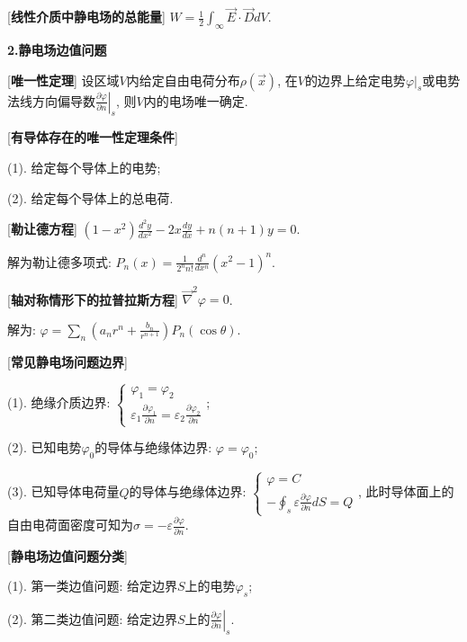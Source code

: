 [\textbf{线性介质中静电场的总能量}] $W=\frac{1}{2}\int_\infty \vec E\cdot\vec D dV$.\par

\begin{center}
 \textbf{2.静电场边值问题}
\end{center}

[\textbf{唯一性定理}] 设区域$V$内给定自由电荷分布$\rho(\vec x)$, 在$V$的边界上给定电势$\varphi|_s$或电势法线方向偏导数$\left.\frac{\partial \varphi}{\partial n}\right|_s$, 则$V$内的电场唯一确定.\par

[\textbf{有导体存在的唯一性定理条件}] \par
\qquad (1). 给定每个导体上的电势;\par
\qquad (2). 给定每个导体上的总电荷.\par

[\textbf{勒让德方程}] $(1-x^2)\frac{d^2y}{dx^2}-2x\frac{dy}{dx}+n(n+1)y=0$.\par
\qquad 解为勒让德多项式: $P_n(x)=\frac{1}{2^nn!}\frac{d^n}{dx^n}(x^2-1)^n$.

\clearpage

[\textbf{轴对称情形下的拉普拉斯方程}] $\vec\nabla^2\varphi=0$.\par
\qquad 解为: $\varphi=\sum\limits_n(a_nr^n+\frac{b_n}{r^{n+1}})P_n(\cos \theta)$.\par

[\textbf{常见静电场问题边界}] \par
\qquad (1). 绝缘介质边界: $\begin{cases}\varphi_1=\varphi_2\\ \varepsilon_1\frac{\partial \varphi_1}{\partial n}=\varepsilon_2\frac{\partial \varphi_2}{\partial n}\end{cases}$;\par
\qquad (2). 已知电势$\varphi_0$的导体与绝缘体边界: $\varphi=\varphi_0$;\par
\qquad (3). 已知导体电荷量$Q$的导体与绝缘体边界: $\begin{cases}\varphi=C\\ -\oint_s\varepsilon\frac{\partial\varphi}{\partial n}dS=Q\end{cases}$, 此时导体面上的自由电荷面密度可知为$\sigma=-\varepsilon\frac{\partial\varphi}{\partial n}$.\par

[\textbf{静电场边值问题分类}]\par
\qquad (1). 第一类边值问题: 给定边界$S$上的电势$\varphi_s$;\par
\qquad (2). 第二类边值问题: 给定边界$S$上的$\left.\frac{\partial\varphi}{\partial n}\right|_s$.\par

